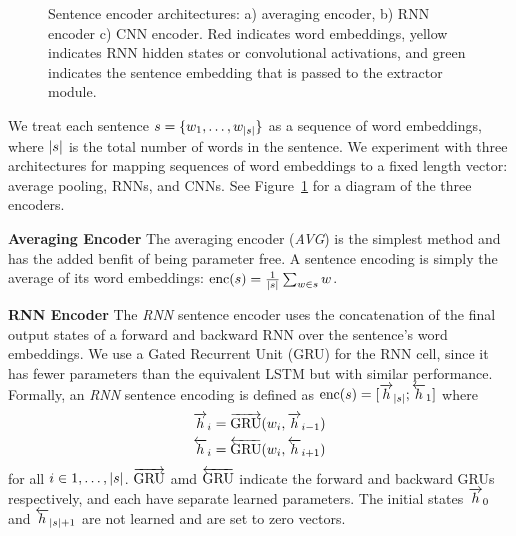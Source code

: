 \begin{figure}
  \caption{Sentence encoder architectures: a) averaging encoder, b) RNN encoder
           c) CNN encoder. Red indicates word embeddings, yellow indicates
           RNN hidden states or convolutional activations, and green 
           indicates the sentence embedding that is passed to the extractor
           module.}
    \label{fig:encoders}
\end{figure}

We treat each sentence $s = \{w_1, \ldots, w_{|s|}\}$ 
as a sequence of word embeddings, where $|s|$ is the total number of words
in the sentence. We experiment with three architectures for mapping sequences
of word embeddings to a fixed length vector: average pooling, RNNs, and CNNs.
See Figure~\ref{fig:encoders} for a diagram of the three encoders.

\textbf{Averaging Encoder} The averaging encoder (\textit{AVG}) is the simplest
method and has the added benfit of being parameter free. 
A sentence encoding is simply the average of its word embeddings: 
$\operatorname{enc}(s) = \frac{1}{|s|} \sum_{w \in s} w$.


\textbf{RNN Encoder} The \textit{RNN} sentence encoder uses the concatenation 
of the
final output states of a forward and backward RNN over the sentence's word
embeddings. We use a Gated Recurrent Unit (GRU) \cite{cho} for the RNN cell,
since it has fewer parameters than the equivalent LSTM but with similar 
performance. Formally, an \textit{RNN} sentence encoding is defined as
$\operatorname{enc}(s) = [\overrightarrow{h}_{|s|}; \overleftarrow{h}_1]$
where 
\begin{align} 
\overrightarrow{h}_i &= \overrightarrow{\operatorname{GRU}}(w_i, \overrightarrow{h}_{i-1}) \\
\overleftarrow{h}_i &= \overleftarrow{\operatorname{GRU}}(w_i, \overleftarrow{h}_{i+1}) 
\end{align}
for all $i \in 1, \ldots, |s|$. $\overrightarrow{\operatorname{GRU}}$ amd $\overleftarrow{\operatorname{GRU}}$ indicate the 
forward and backward GRUs respectively, and each have separate learned 
parameters.
The initial states $\overrightarrow{h}_0$ and $\overleftarrow{h}_{|s| + 1}$ are not 
learned and are set to zero vectors.

